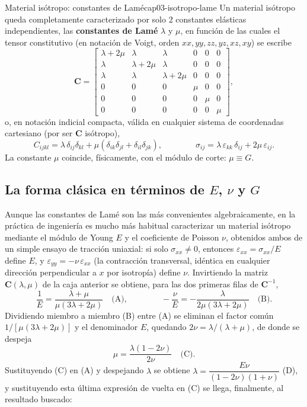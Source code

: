 \begin{ecnimportante}{Material isótropo: constantes de Lamé}{cap03-isotropo-lame}
Un material isótropo queda completamente caracterizado por solo $\boxed{2}$ constantes elásticas independientes, las \textbf{constantes de Lamé} $\lambda$ y $\mu$, en función de las cuales el tensor constitutivo (en notación de Voigt, orden $xx,yy,zz,yz,xz,xy$) se escribe
\[
\bm C =
\begin{bmatrix}
\lambda+2\mu & \lambda & \lambda & 0 & 0 & 0 \\
\lambda & \lambda+2\mu & \lambda & 0 & 0 & 0 \\
\lambda & \lambda & \lambda+2\mu & 0 & 0 & 0 \\
0 & 0 & 0 & \mu & 0 & 0 \\
0 & 0 & 0 & 0 & \mu & 0 \\
0 & 0 & 0 & 0 & 0 & \mu
\end{bmatrix},
\]
o, en notación indicial compacta, válida en cualquier sistema de coordenadas cartesiano (por ser $\bm C$ isótropo),
\[
C_{ijkl} = \lambda\,\delta_{ij}\delta_{kl} + \mu\left(\delta_{ik}\delta_{jl}+\delta_{il}\delta_{jk}\right), \qquad\qquad \sigma_{ij} = \lambda\,\varepsilon_{kk}\,\delta_{ij} + 2\mu\,\varepsilon_{ij}.
\]
La constante $\mu$ coincide, físicamente, con el módulo de corte: $\mu\equiv G$.
\end{ecnimportante}

\subsection{La forma clásica en términos de \texorpdfstring{$E$, $\nu$ y $G$}{E, nu y G}}

Aunque las constantes de Lamé son las más convenientes algebraicamente, en la práctica de ingeniería es mucho más habitual caracterizar un material isótropo mediante el módulo de Young $E$ y el coeficiente de Poisson $\nu$, obtenidos ambos de un simple ensayo de tracción uniaxial: si solo $\sigma_{xx}\neq 0$, entonces $\varepsilon_{xx}=\sigma_{xx}/E$ define $E$, y $\varepsilon_{yy}=-\nu\,\varepsilon_{xx}$ (la contracción transversal, idéntica en cualquier dirección perpendicular a $x$ por isotropía) define $\nu$. Invirtiendo la matriz $\bm C(\lambda,\mu)$ de la caja anterior se obtiene, para las dos primeras filas de $\bm C^{-1}$,
\[
\frac{1}{E} = \frac{\lambda+\mu}{\mu(3\lambda+2\mu)} \quad \text{(A)}, \qquad\qquad -\frac{\nu}{E} = -\frac{\lambda}{2\mu(3\lambda+2\mu)} \quad \text{(B)}.
\]
Dividiendo miembro a miembro (B) entre (A) se eliminan el factor común $1/[\mu(3\lambda+2\mu)]$ y el denominador $E$, quedando $2\nu = \lambda/(\lambda+\mu)$, de donde se despeja
\[
\mu = \frac{\lambda(1-2\nu)}{2\nu} \quad \text{(C)}.
\]
Sustituyendo (C) en (A) y despejando $\lambda$ se obtiene $\lambda = \dfrac{E\nu}{(1-2\nu)(1+\nu)}$ (D), y sustituyendo esta última expresión de vuelta en (C) se llega, finalmente, al resultado buscado:

